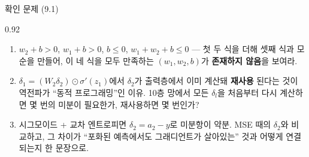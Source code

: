 \begin{frame}{확인 문제 (9.1)}
\begin{center}\begin{varwidth}{0.92\textwidth}
  \small
  \begin{enumerate}
    \item {} $w_2+b>0$, $w_1+b>0$, $b\le 0$,
      $w_1+w_2+b\le 0$ — 첫 두 식을 더해 셋째 식과 모순을 만들어,
      이 네 식을 모두 만족하는 $(w_1,w_2,b)$가 \textbf{존재하지
      않음}을 보여라.
    \item {} $\delta_1 = (W_2\delta_2)\odot
      \sigma'(z_1)$에서 $\delta_2$가 출력층에서 이미 계산돼 \textbf{재사용}
      된다는 것이 역전파가 ``동적 프로그래밍''인 이유. 10층 망에서
      모든 $\delta_l$을 처음부터 다시 계산하면 몇 번의 미분이 필요한가,
      재사용하면 몇 번인가?
    \item {} 시그모이드 + 교차 엔트로피면
      $\delta_2 = a_2 - y$로 미분항이 약분. MSE 때의 $\delta_2$와
      비교하고, 그 차이가 ``포화된 예측에서도 그래디언트가 살아있는''
      것과 어떻게 연결되는지 한 문장으로.
  \end{enumerate}
\end{varwidth}\end{center}
\end{frame}

